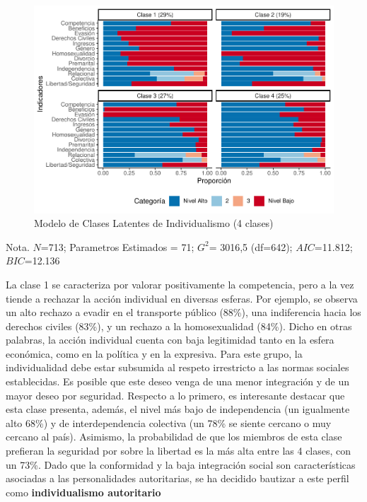 \documentclass[12pt,oneside]{templates/facsothesis}
\begin{document}
\begin{figure}[!ht]

{\centering \includegraphics[width=1\linewidth,]{tesis_files/figure-latex/unnamed-chunk-8-1} 

}

\caption{Modelo de Clases Latentes de Individualismo (4 clases)}\label{fig:unnamed-chunk-8}
\end{figure}
\FloatBarrier

Nota. \(N\)=713; Parametros Estimados = 71; \(G^2\)= 3016,5 (df=642); \(AIC\)=11.812; \(BIC\)=12.136

La clase 1 se caracteriza por valorar positivamente la competencia, pero a la vez tiende a rechazar la acción individual en diversas esferas. Por ejemplo, se observa un alto rechazo a evadir en el transporte público (88\%), una indiferencia hacia los derechos civiles (83\%), y un rechazo a la homosexualidad (84\%). Dicho en otras palabras, la acción individual cuenta con baja legitimidad tanto en la esfera económica, como en la política y en la expresiva. Para este grupo, la individualidad debe estar subsumida al respeto irrestricto a las normas sociales establecidas. Es posible que este deseo venga de una menor integración y de un mayor deseo por seguridad. Respecto a lo primero, es interesante destacar que esta clase presenta, además, el nivel más bajo de independencia (un igualmente alto 68\%) y de interdependencia colectiva (un 78\% se siente cercano o muy cercano al país). Asimismo, la probabilidad de que los miembros de esta clase prefieran la seguridad por sobre la libertad es la más alta entre las 4 clases, con un 73\%. Dado que la conformidad \citep{zakrisson2005} y la baja integración social \citep{gidron2020} son características asociadas a las personalidades autoritarias, se ha decidido bautizar a este perfil como \textbf{individualismo autoritario}
\end{document}
